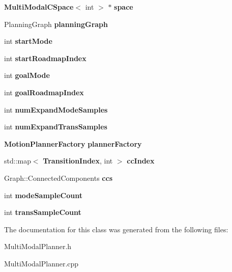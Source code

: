 \begin{DoxyCompactItemize}
\item 
{\bf Multi\+Modal\+C\+Space}$<$ int $>$ $\ast$ {\bfseries space}\label{classMultiModalPRM_a8bb45b62a40d65d52b11af7b50725fee}

\item 
Planning\+Graph {\bfseries planning\+Graph}\label{classMultiModalPRM_a596e8de91e43ce2dddeb832702adb25e}

\item 
int {\bfseries start\+Mode}\label{classMultiModalPRM_abd565117f0ab56def1adbc0d0b0b7364}

\item 
int {\bfseries start\+Roadmap\+Index}\label{classMultiModalPRM_aec65614f66a1bdf20a375611d9894fed}

\item 
int {\bfseries goal\+Mode}\label{classMultiModalPRM_ae82bc5ee4f4cd22ac7884d03cc763b24}

\item 
int {\bfseries goal\+Roadmap\+Index}\label{classMultiModalPRM_ac4edcaeb7b9f831fb8fb80a7a7d5dc0e}

\item 
int {\bfseries num\+Expand\+Mode\+Samples}\label{classMultiModalPRM_aafcc7e72a29414eccc1a363a39a6df74}

\item 
int {\bfseries num\+Expand\+Trans\+Samples}\label{classMultiModalPRM_a124090370e3e8b159d11683a1ef3e183}

\item 
{\bf Motion\+Planner\+Factory} {\bfseries planner\+Factory}\label{classMultiModalPRM_ac235efba7a0f24aac67c600ffcc6f0db}

\item 
std\+::map$<$ {\bf Transition\+Index}, int $>$ {\bfseries cc\+Index}\label{classMultiModalPRM_a9c3bc4d44c76226d486bafd2f42ce2b8}

\item 
Graph\+::\+Connected\+Components {\bfseries ccs}\label{classMultiModalPRM_a48a2376a9dfcbf9501a7abe54f9e8f58}

\item 
int {\bfseries mode\+Sample\+Count}\label{classMultiModalPRM_ae0d5c25df1c5abe5604e2f67668d9a0d}

\item 
int {\bfseries trans\+Sample\+Count}\label{classMultiModalPRM_ac0f6973bad3547267b393bdacf1a0836}

\end{DoxyCompactItemize}


The documentation for this class was generated from the following files\+:\begin{DoxyCompactItemize}
\item 
Multi\+Modal\+Planner.\+h\item 
Multi\+Modal\+Planner.\+cpp\end{DoxyCompactItemize}
